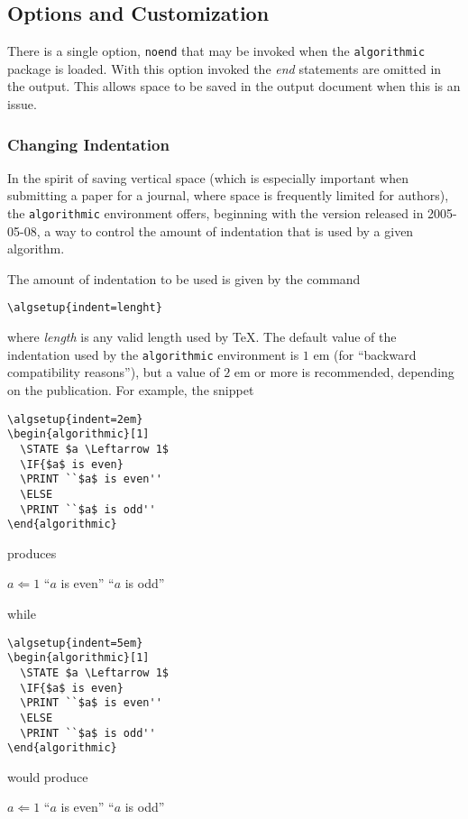 \documentclass[letterpaper]{article}
\newcommand{\keyword}[1]{\texttt{#1}}
\begin{document}
\subsection[Options/Customization]%
{Options and Customization}

There is a single option, \keyword{noend}\label{kwd:noend} that may be
invoked when the \texttt{algorithmic} package is loaded.  With this
option invoked the \emph{end} statements are omitted in the output.
This allows space to be saved in the output document when this is an
issue.

\subsubsection{Changing Indentation}
\label{sec:changing-indentation}
In the spirit of saving vertical space (which is especially important
when submitting a paper for a journal, where space is frequently limited
for authors), the \keyword{algorithmic} environment offers, beginning
with the version released in 2005-05-08, a way to control the amount of
indentation that is used by a given algorithm.

The amount of indentation to be used is given by the command
\begin{verbatim}
\algsetup{indent=lenght}
\end{verbatim}
where \emph{length} is any valid length used by \TeX. The default value
of the indentation used by the \keyword{algorithmic} environment is $1$
em (for ``backward compatibility reasons''), but a value of $2$ em or
more is recommended, depending on the publication. For example, the
snippet
\begin{verbatim}
\algsetup{indent=2em}
\begin{algorithmic}[1]
  \STATE $a \Leftarrow 1$
  \IF{$a$ is even}
  \PRINT ``$a$ is even''
  \ELSE
  \PRINT ``$a$ is odd''
\end{algorithmic}
\end{verbatim}
produces
\begin{algorithmic}[1]
  \STATE $a \Leftarrow 1$
    \PRINT ``$a$ is even''
  \ELSE
    \PRINT ``$a$ is odd''
  \ENDIF
\end{algorithmic}
while
\begin{verbatim}
\algsetup{indent=5em}
\begin{algorithmic}[1]
  \STATE $a \Leftarrow 1$
  \IF{$a$ is even}
  \PRINT ``$a$ is even''
  \ELSE
  \PRINT ``$a$ is odd''
\end{algorithmic}
\end{verbatim}
would produce
\begin{algorithmic}[1]
  \STATE $a \Leftarrow 1$
    \PRINT ``$a$ is even''
  \ELSE
    \PRINT ``$a$ is odd''
  \ENDIF
\end{algorithmic}
\end{document}
